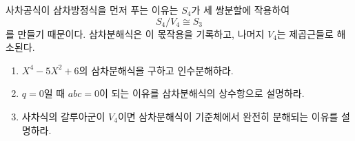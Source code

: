 \begin{keyidea}
사차공식이 삼차방정식을 먼저 푸는 이유는 $S_4$가 세 쌍분할에 작용하여
\[
  S_4/V_4\cong S_3
\]
를 만들기 때문이다. 삼차분해식은 이 몫작용을 기록하고, 나머지 $V_4$는 제곱근들로 해소된다.
\end{keyidea}

\begin{checkpoint}
\begin{enumerate}[label=(\alph*)]
  \item $X^4-5X^2+6$의 삼차분해식을 구하고 인수분해하라.
  \item $q=0$일 때 $abc=0$이 되는 이유를 삼차분해식의 상수항으로 설명하라.
  \item 사차식의 갈루아군이 $V_4$이면 삼차분해식이 기준체에서 완전히 분해되는 이유를 설명하라.
\end{enumerate}
\end{checkpoint}
